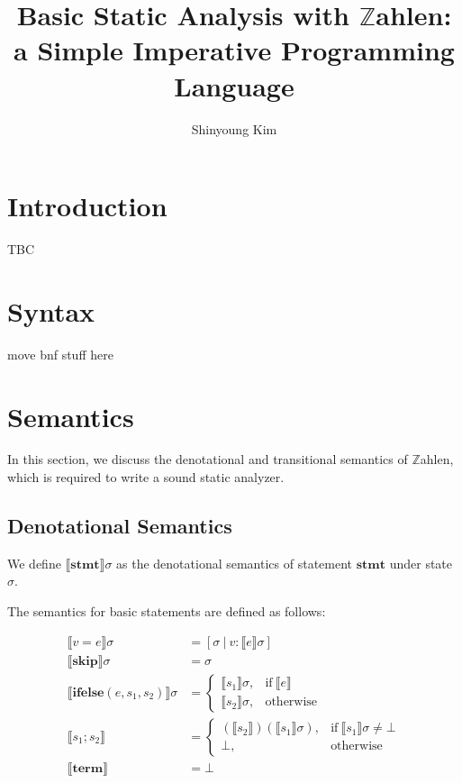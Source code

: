 \documentclass{article}
\title{Basic Static Analysis with $\mathbb{Z}$ahlen: a Simple Imperative Programming Language}
\author{Shinyoung Kim}
\date{}
\begin{document}
	\maketitle
	
	\section{Introduction}
	TBC
	
	\section{Syntax}
	move bnf stuff here
	\section{Semantics}
	
	In this section, we discuss the denotational and transitional semantics of $\mathbb{Z}$ahlen, which is required to write a sound static analyzer.
	
	\subsection{Denotational Semantics}
	
	We define $\llbracket \mathbf{stmt} \rrbracket \sigma$ as the denotational semantics of statement $\mathbf{stmt}$ under state $\sigma$.
	
	The semantics for basic statements are defined as follows:
	
	\begin{align*}
			\llbracket v = e \rrbracket \sigma &= [\sigma \ | \ v: \llbracket e \rrbracket \sigma] \\
			\llbracket \mathbf{skip} \rrbracket \sigma &= \sigma
			\\
			\llbracket \mathbf{ifelse}(e, s_1, s_2) \rrbracket \sigma &=
			\begin{cases}
				\llbracket s_1 \rrbracket \sigma, & \text{if} \ \llbracket e \rrbracket \\
				\llbracket s_2 \rrbracket \sigma, & \text{otherwise}
			\end{cases}
			\\
			\llbracket s_1 ; s_2 \rrbracket &=
			\begin{cases}
				(\llbracket s_2 \rrbracket)(\llbracket s_1 \rrbracket \sigma), & \text{if} \ \llbracket s_1 \rrbracket \sigma \neq \bot \\
				\bot, & \text{otherwise}
			\end{cases}
			\\
			\llbracket \mathbf{term} \rrbracket &= \bot
	\end{align*}
	
\end{document}
